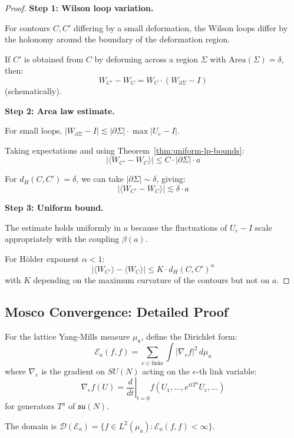 \begin{proof}
\textbf{Step 1: Wilson loop variation.}

For contours $C, C'$ differing by a small deformation, the Wilson loops differ 
by the holonomy around the boundary of the deformation region.

If $C'$ is obtained from $C$ by deforming across a region $\Sigma$ with 
$\text{Area}(\Sigma) = \delta$, then:
\[
W_{C'} - W_C = W_C \cdot (W_{\partial\Sigma} - I)
\]
(schematically).

\textbf{Step 2: Area law estimate.}

For small loops, $|W_{\partial\Sigma} - I| \lesssim |\partial\Sigma| \cdot \max|U_e - I|$.

Taking expectations and using Theorem~\ref{thm:uniform-lp-bounds}:
\[
|\langle W_{C'} - W_C \rangle| \leq C \cdot |\partial\Sigma| \cdot a
\]

For $d_H(C, C') = \delta$, we can take $|\partial\Sigma| \sim \delta$, giving:
\[
|\langle W_{C'} - W_C \rangle| \lesssim \delta \cdot a
\]

\textbf{Step 3: Uniform bound.}

The estimate holds uniformly in $a$ because the fluctuations of $U_e - I$ 
scale appropriately with the coupling $\beta(a)$.

For Hölder exponent $\alpha < 1$:
\[
|\langle W_{C'} \rangle - \langle W_C \rangle| \leq K \cdot d_H(C, C')^\alpha
\]
with $K$ depending on the maximum curvature of the contours but not on $a$.
\end{proof}

\subsection{Mosco Convergence: Detailed Proof}

\begin{definition}
\label{def:dirichlet-form-lattice}
For the lattice Yang-Mills measure $\mu_a$, define the Dirichlet form:
\[
\mathcal{E}_a(f, f) = \sum_{e \in \text{links}} \int |\nabla_e f|^2 \, d\mu_a
\]
where $\nabla_e$ is the gradient on $SU(N)$ acting on the $e$-th link variable:
\[
\nabla_e f(U) = \left.\frac{d}{dt}\right|_{t=0} f(U_1, \ldots, e^{itT^a}U_e, \ldots)
\]
for generators $T^a$ of $\mathfrak{su}(N)$.

The domain is $\mathcal{D}(\mathcal{E}_a) = \{f \in L^2(\mu_a) : \mathcal{E}_a(f,f) < \infty\}$.
\end{definition}

